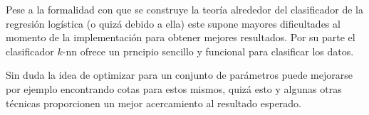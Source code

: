\documentclass[11pt,letterpaper, reqno]{article}
\begin{document}
Pese a la formalidad con que se construye la teoría alrededor del clasificador de la regresión logística (o quizá debido a ella) este supone mayores dificultades al momento de la implementación para obtener mejores resultados. Por su parte el clasificador $k$-nn ofrece un prncipio sencillo y funcional para clasificar los datos.

Sin duda la idea de optimizar para un conjunto de parámetros puede mejorarse por ejemplo encontrando cotas para estos mismos, quizá esto y algunas otras técnicas proporcionen un mejor acercamiento al resultado esperado.
\end{document}
